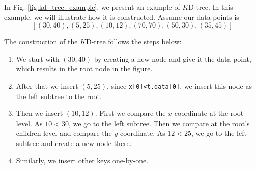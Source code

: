 \begin{mscexample}
	In Fig. \ref{fig:kd_tree_example}, we present an example of $K$D-tree. In this example, we will illustrate how it is constructed. Assume our data points is $$[(30,40), (5,25), (10,12), (70,70), (50,30), (35,45)]$$
	
	The construction of the $K$D-tree follows the steps below:
	
	\begin{enumerate}
		\item We start with $(30,40)$ by creating a new node and give it the data point, which results in the root node in the figure.
		\item After that we insert $(5,25)$, since \texttt{x[0]<t.data[0]}, we insert this node as the left subtree to the root.
		\item Then we insert $(10, 12)$. First we compare the $x$-coordinate at the root level. As $10<30$, we go to the left subtree. Then we compare at the root's children level and compare the $y$-coordinate. As $12<25$, we go to the left subtree and create a new node there.
		\item Similarly, we insert other keys one-by-one.
	\end{enumerate}
	
\end{mscexample}